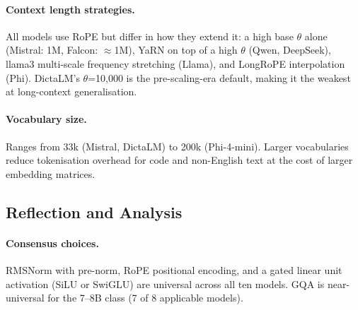 \documentclass[11pt, a4paper]{article}
\begin{document}
\paragraph{Context length strategies.}
All models use RoPE but differ in how they extend it: a high base $\theta$ alone
(Mistral: 1M, Falcon: $\approx$1M), YaRN on top of a high $\theta$ (Qwen, DeepSeek),
llama3 multi-scale frequency stretching (Llama), and LongRoPE interpolation (Phi).
DictaLM's $\theta$=10,000 is the pre-scaling-era default, making it the weakest
at long-context generalisation.

\paragraph{Vocabulary size.}
Ranges from 33k (Mistral, DictaLM) to 200k (Phi-4-mini).
Larger vocabularies reduce tokenisation overhead for code and non-English text
at the cost of larger embedding matrices.

\subsection{Reflection and Analysis}

\paragraph{Consensus choices.}
RMSNorm with pre-norm, RoPE positional encoding, and a gated linear unit
activation (SiLU or SwiGLU) are universal
across all ten models.
GQA is near-universal for the 7--8B class (7 of 8 applicable models).
\end{document}
